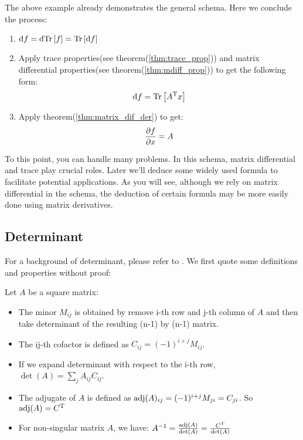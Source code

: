 The above example already demonstrates the general schema. 
Here we conclude the process:
\begin{enumerate}
	\item $\mathrm{d}f = \mathrm{d}\mathrm{Tr}\left[f\right] =\mathrm{Tr}\left[\mathrm{d}f\right] $
	\item Apply trace properties(see theorem(\ref{thm:trace_prop}))
	and matrix differential properties(see theorem(\ref{thm:mdiff_prop}))
	to get the following form:
		\begin{equation}
			\mathrm{d}f = \mathrm{Tr}\left[A^\mathrm{T}x\right]
		\end{equation}
	\item Apply theorem(\ref{thm:matrix_dif_der}) to get:
		\begin{equation}
			\dfrac{\partial f}{\partial x} = A
		\end{equation}
\end{enumerate}

To this point, you can handle many problems. In this schema, 
matrix differential and trace play crucial roles. Later we'll 
deduce some widely used formula to facilitate potential 
applications. As you will see, although we rely on matrix differential 
in the schema, the deduction of certain formula may be more easily done 
using matrix derivatives. 

\subsection{Determinant}

For a background of determinant, please refer to \cite{wiki_det}. 
We first quote some definitions and properties without proof:
\begin{mythm}
	Let $A$ be a square matrix:
	\begin{itemize}
		\item The minor $M_{ij}$ is obtained by remove 
		i-th row and j-th column of $A$ and then take determinant
		of the resulting (n-1) by (n-1) matrix. 
		\item The ij-th cofactor is defined as $C_{ij} = (-1)^{i+j}M_{ij}$. 
		\item If we expand determinant with respect to the i-th row, 
		$\det(A) = \sum_{j}{A_{ij}C_{ij}}$. 
		\item The adjugate of $A$ is defined as 
		$\mathrm{adj}(A)_{ij}=(-1)^{i+j}M_{ji}=C_{ji}$. So 
		$\mathrm{adj}(A) = C^\mathrm{T}$
		\item For non-singular matrix $A$, we have:
		$A^{-1} = \frac{\mathrm{adj}(A)}{\det(A)} = \frac{C^\mathrm{T}}{\det(A)}$
	\end{itemize}
\end{mythm}

